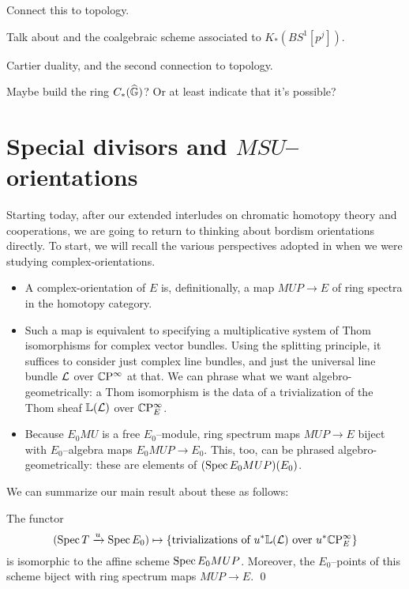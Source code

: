 Connect this to topology.



\begin{example}
Talk about  and the coalgebraic scheme associated to $K_*(BS^1[p^j])$.
\end{example}




Cartier duality, and the second connection to topology.




Maybe build the ring $C_*(\widehat{\mathbb G})$?  Or at least indicate that it's possible?





\section{Special divisors and $MSU$--orientations}

Starting today, after our extended interludes on chromatic homotopy theory and cooperations, we are going to return to thinking about bordism orientations directly.  To start, we will recall the various perspectives adopted in  when we were studying complex-orientations.
\begin{itemize}
\item A complex-orientation of $E$ is, definitionally, a map $MUP \to E$ of ring spectra in the homotopy category.
\item Such a map is equivalent to specifying a multiplicative system of Thom isomorphisms for complex vector bundles.  Using the splitting principle, it suffices to consider just complex line bundles, and just the universal line bundle $\mathcal{L}$ over $\mathbb{C}\mathrm P^\infty$ at that.  We can phrase what we want algebro-geometrically: a Thom isomorphism is the data of a trivialization of the Thom sheaf $\mathbb{L}(\mathcal{L})$ over $\mathbb{C}\mathrm P^\infty_E$.
\item Because $E_0 MU$ is a free $E_0$--module, ring spectrum maps $MUP \to E$ biject with $E_0$--algebra maps $E_0 MUP \to E_0$.  This, too, can be phrased algebro-geometrically: these are elements of $(\operatorname{Spec} E_0 MUP)(E_0)$.
\end{itemize}
We can summarize our main result about these as follows:
\begin{theorem}\label{BUZTriumvirate}
The functor \[(\operatorname{Spec} T \xrightarrow{u} \operatorname{Spec} E_0) \mapsto \left\{ \text{trivializations of $u^* \mathbb{L}(\mathcal{L})$ over $u^* \mathbb{C}\mathrm P^\infty_E$} \right\}\] is isomorphic to the affine scheme $\operatorname{Spec} E_0 MUP$.  Moreover, the $E_0$--points of this scheme biject with ring spectrum maps $MUP \to E$. \qed
\end{theorem}

